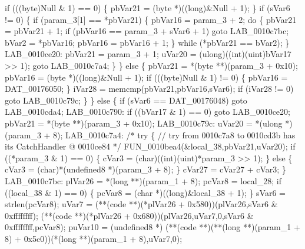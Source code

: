 \documentclass[
]{article}
\newenvironment{Shaded}{}{}
\newcommand{\NormalTok}[1]{#1}
\begin{document}
\begin{Shaded}
\begin{Highlighting}[]
\NormalTok{      if (((byte)Null \& 1) == 0) \{}
\NormalTok{        pbVar21 = (byte *)((long)\&Null + 1);}
\NormalTok{      \}}
\NormalTok{      if (sVar6 != 0) \{}
\NormalTok{        if (param\_3[1] == *pbVar21) \{}
\NormalTok{          pbVar16 = param\_3 + 2;}
\NormalTok{          do \{}
\NormalTok{            pbVar21 = pbVar21 + 1;}
\NormalTok{            if (pbVar16 == param\_3 + sVar6 + 1) goto LAB\_0010c7bc;}
\NormalTok{            bVar2 = *pbVar16;}
\NormalTok{            pbVar16 = pbVar16 + 1;}
\NormalTok{          \} while (*pbVar21 == bVar2);}
\NormalTok{        \}}
\NormalTok{LAB\_0010ce20:}
\NormalTok{        pbVar21 = param\_3 + 1;}
\NormalTok{        uVar20 = (ulong)((int)(uint)bVar17 \textgreater{}\textgreater{} 1);}
\NormalTok{        goto LAB\_0010c7a4;}
\NormalTok{      \}}
\NormalTok{    \}}
\NormalTok{    else \{}
\NormalTok{      pbVar21 = *(byte **)(param\_3 + 0x10);}
\NormalTok{      pbVar16 = (byte *)((long)\&Null + 1);}
\NormalTok{      if (((byte)Null \& 1) != 0) \{}
\NormalTok{        pbVar16 = DAT\_00176050;}
\NormalTok{      \}}
\NormalTok{      iVar28 = memcmp(pbVar21,pbVar16,sVar6);}
\NormalTok{      if (iVar28 != 0) goto LAB\_0010c79c;}
\NormalTok{    \}}
\NormalTok{  \}}
\NormalTok{  else \{}
\NormalTok{    if (sVar6 == DAT\_00176048) goto LAB\_0010cda4;}
\NormalTok{LAB\_0010c790:}
\NormalTok{    if ((bVar17 \& 1) == 0) goto LAB\_0010ce20;}
\NormalTok{    pbVar21 = *(byte **)(param\_3 + 0x10);}
\NormalTok{LAB\_0010c79c:}
\NormalTok{    uVar20 = *(ulong *)(param\_3 + 8);}
\NormalTok{LAB\_0010c7a4:}
\NormalTok{                    /* try \{ // try from 0010c7a8 to 0010cd3b has its CatchHandler @ 0010ce84 */}
\NormalTok{    FUN\_0010bea4(\&local\_38,pbVar21,uVar20);}
\NormalTok{    if ((*param\_3 \& 1) == 0) \{}
\NormalTok{      cVar3 = (char)((int)(uint)*param\_3 \textgreater{}\textgreater{} 1);}
\NormalTok{    \}}
\NormalTok{    else \{}
\NormalTok{      cVar3 = (char)*(undefined8 *)(param\_3 + 8);}
\NormalTok{    \}}
\NormalTok{    cVar27 = cVar27 + cVar3;}
\NormalTok{  \}}
\NormalTok{LAB\_0010c7bc:}
\NormalTok{  plVar26 = *(long **)(param\_1 + 8);}
\NormalTok{  pcVar8 = local\_28;}
\NormalTok{  if ((local\_38 \& 1) == 0) \{}
\NormalTok{    pcVar8 = (char *)((long)\&local\_38 + 1);}
\NormalTok{  \}}
\NormalTok{  sVar6 = strlen(pcVar8);}
\NormalTok{  uVar7 = (**(code **)(*plVar26 + 0x580))(plVar26,sVar6 \& 0xffffffff);}
\NormalTok{  (**(code **)(*plVar26 + 0x680))(plVar26,uVar7,0,sVar6 \& 0xffffffff,pcVar8);}
\NormalTok{  puVar10 = (undefined8 *)}
\NormalTok{            (**(code **)(**(long **)(param\_1 + 8) + 0x5c0))(*(long **)(param\_1 + 8),uVar7,0);}

\end{Highlighting}
\end{Shaded}
\end{document}
